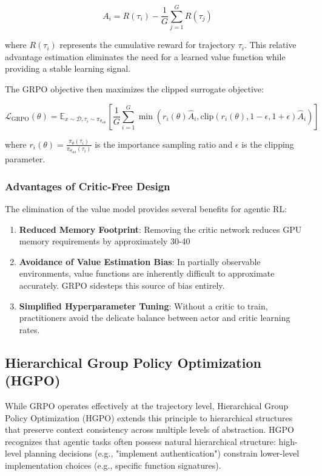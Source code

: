 $$A_i = R(\tau_i) - \frac{1}{G}\sum_{j=1}^{G} R(\tau_j)$$

where $R(\tau_i)$ represents the cumulative reward for trajectory $\tau_i$. This relative advantage estimation eliminates the need for a learned value function while providing a stable learning signal.

The GRPO objective then maximizes the clipped surrogate objective:

$$\mathcal{L}_{\text{GRPO}}(\theta) = \mathbb{E}_{x \sim \mathcal{D}, \tau_i \sim \pi_{\theta_{\text{old}}}} \left[ \frac{1}{G}\sum_{i=1}^{G} \min\left( r_i(\theta)\hat{A}_i, \text{clip}(r_i(\theta), 1-\epsilon, 1+\epsilon)\hat{A}_i \right) \right]$$

where $r_i(\theta) = \frac{\pi_\theta(\tau_i)}{\pi_{\theta_{\text{old}}}(\tau_i)}$ is the importance sampling ratio and $\epsilon$ is the clipping parameter.

\subsubsection{Advantages of Critic-Free Design}

The elimination of the value model provides several benefits for agentic RL:

\begin{enumerate}
    \item \textbf{Reduced Memory Footprint}: Removing the critic network reduces GPU memory requirements by approximately 30-40%

    \item \textbf{Avoidance of Value Estimation Bias}: In partially observable environments, value functions are inherently difficult to approximate accurately. GRPO sidesteps this source of bias entirely.

    \item \textbf{Simplified Hyperparameter Tuning}: Without a critic to train, practitioners avoid the delicate balance between actor and critic learning rates.

\end{enumerate}
\subsection{Hierarchical Group Policy Optimization (HGPO)}

While GRPO operates effectively at the trajectory level, Hierarchical Group Policy Optimization (HGPO) extends this principle to hierarchical structures that preserve context consistency across multiple levels of abstraction. HGPO recognizes that agentic tasks often possess natural hierarchical structure: high-level planning decisions (e.g., "implement authentication") constrain lower-level implementation choices (e.g., specific function signatures).

